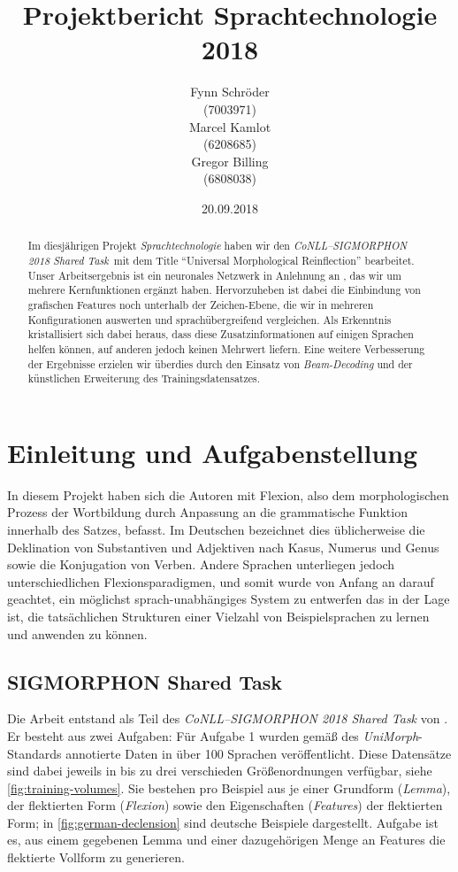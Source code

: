 \documentclass[11pt,a4paper]{article}
\title{Projektbericht Sprachtechnologie 2018}
\author{
Fynn Schröder\\
(7003971)
\\\And Marcel Kamlot\\
(6208685)
\\\And Gregor Billing\\
(6808038)}
\date{20.09.2018}
\newcommand{\prostst}[0]{\emph{CoNLL--SIGMORPHON 2018 Shared Task}}
\begin{document}
\maketitle
\pagestyle{plain}

\begin{abstract}
Im diesjährigen Projekt \textit{Sprachtechnologie} haben wir den \prostst~mit dem Title \enquote{Universal Morphological Reinflection} bearbeitet. Unser Arbeitsergebnis ist ein neuronales Netzwerk in Anlehnung an \citet{cluzh:MakarovRC17}, das wir um mehrere Kernfunktionen ergänzt haben. Hervorzuheben ist dabei die Einbindung von grafischen Features noch unterhalb der Zeichen-Ebene, die wir in mehreren Konfigurationen auswerten und sprachübergreifend vergleichen. Als Erkenntnis kristallisiert sich dabei heraus, dass diese Zusatzinformationen auf einigen Sprachen helfen können, auf anderen jedoch keinen Mehrwert liefern. Eine weitere Verbesserung der Ergebnisse erzielen wir überdies durch den Einsatz von \textit{Beam-Decoding} und der künstlichen Erweiterung des Trainingsdatensatzes.
\end{abstract}

\section{Einleitung und Aufgabenstellung}
\label{sec:introduction}
In diesem Projekt haben sich die Autoren mit Flexion, also dem morphologischen Prozess der Wortbildung durch Anpassung an die grammatische Funktion innerhalb des Satzes, befasst. Im Deutschen bezeichnet dies üblicherweise die Deklination von Substantiven und Adjektiven nach Kasus, Numerus und Genus sowie die Konjugation von Verben.
Andere Sprachen unterliegen jedoch unterschiedlichen Flexionsparadigmen, und somit wurde von Anfang an darauf geachtet, ein möglichst sprach-unabhängiges System zu entwerfen das in der Lage ist, die tatsächlichen Strukturen einer Vielzahl von Beispielsprachen zu lernen und anwenden zu können.

\subsection{SIGMORPHON Shared Task}
\label{sec:sub:shared_task}
Die Arbeit entstand als Teil des \textit{CoNLL--SIGMORPHON 2018 Shared Task} von \citet{sigmorphon:st2018}. Er besteht aus zwei Aufgaben: Für Aufgabe 1 wurden gemäß des \textit{UniMorph}-Standards \citep{kirov:unimorph2018} annotierte Daten in über 100 Sprachen veröffentlicht. Diese Datensätze sind dabei jeweils in bis zu drei verschieden Größenordnungen verfügbar, siehe \autoref{fig:training-volumes}. Sie bestehen pro Beispiel aus je einer Grundform (\textit{Lemma}), der flektierten Form (\textit{Flexion}) sowie den Eigenschaften (\textit{Features}) der flektierten Form; in \autoref{fig:german-declension} sind deutsche Beispiele dargestellt. Aufgabe ist es, aus einem gegebenen Lemma und einer dazugehörigen Menge an Features die flektierte Vollform zu generieren.
\end{document}
